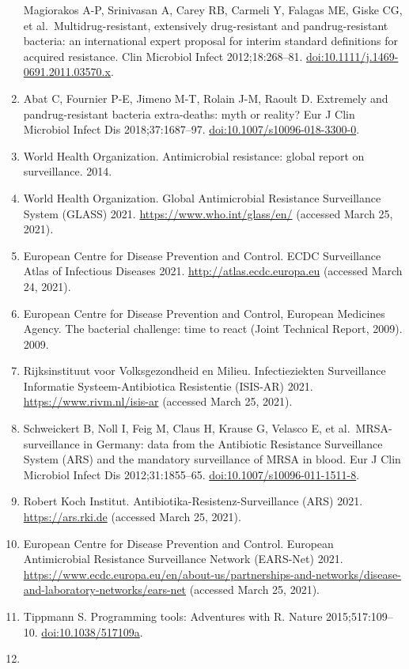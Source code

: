 \documentclass[
]{book}
\begin{document}
\begin{enumerate}
  Magiorakos A-P, Srinivasan A, Carey RB, Carmeli Y, Falagas ME, Giske CG, et al.~Multidrug-resistant, extensively drug-resistant and pandrug-resistant bacteria: an international expert proposal for interim standard definitions for acquired resistance. Clin Microbiol Infect 2012;18:268--81. \url{doi:10.1111/j.1469-0691.2011.03570.x}.
\item
  Abat C, Fournier P-E, Jimeno M-T, Rolain J-M, Raoult D. Extremely and pandrug-resistant bacteria extra-deaths: myth or reality? Eur J Clin Microbiol Infect Dis 2018;37:1687--97. \url{doi:10.1007/s10096-018-3300-0}.
\item
  World Health Organization. Antimicrobial resistance: global report on surveillance. 2014.
\item
  World Health Organization. Global Antimicrobial Resistance Surveillance System (GLASS) 2021. \url{https://www.who.int/glass/en/} (accessed March 25, 2021).
\item
  European Centre for Disease Prevention and Control. ECDC Surveillance Atlas of Infectious Diseases 2021. \url{http://atlas.ecdc.europa.eu} (accessed March 24, 2021).
\item
  European Centre for Disease Prevention and Control, European Medicines Agency. The bacterial challenge: time to react (Joint Technical Report, 2009). 2009.
\item
  Rijksinstituut voor Volksgezondheid en Milieu. Infectieziekten Surveillance Informatie Systeem-Antibiotica Resistentie (ISIS-AR) 2021. \url{https://www.rivm.nl/isis-ar} (accessed March 25, 2021).
\item
  Schweickert B, Noll I, Feig M, Claus H, Krause G, Velasco E, et al.~MRSA-surveillance in Germany: data from the Antibiotic Resistance Surveillance System (ARS) and the mandatory surveillance of MRSA in blood. Eur J Clin Microbiol Infect Dis 2012;31:1855--65. \url{doi:10.1007/s10096-011-1511-8}.
\item
  Robert Koch Institut. Antibiotika-Resistenz-Surveillance (ARS) 2021. \url{https://ars.rki.de} (accessed March 25, 2021).
\item
  European Centre for Disease Prevention and Control. European Antimicrobial Resistance Surveillance Network (EARS-Net) 2021. \url{https://www.ecdc.europa.eu/en/about-us/partnerships-and-networks/disease-and-laboratory-networks/ears-net} (accessed March 25, 2021).
\item
  Tippmann S. Programming tools: Adventures with R. Nature 2015;517:109--10. \url{doi:10.1038/517109a}.
\item

\end{enumerate}
\end{document}
